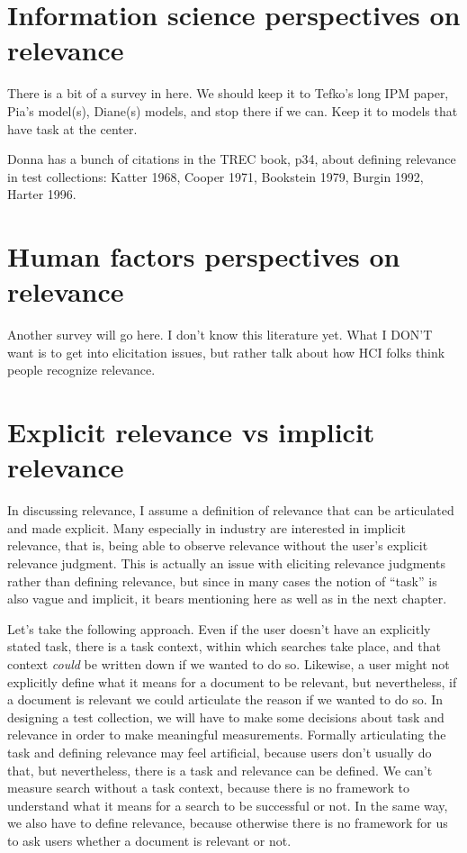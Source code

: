 \documentclass[nobib]{tufte-book}
\begin{document}
\section{Information science perspectives on relevance}

There is a bit of a survey in here.  We should keep it to Tefko's long IPM paper, Pia's model(s), Diane(s) models, and stop there if we can.  Keep it to models that have task at the center.

Donna has a bunch of citations in the TREC book, p34, about defining relevance in test collections: Katter 1968, Cooper 1971, Bookstein 1979, Burgin 1992, Harter 1996.

\section{Human factors perspectives on relevance}

Another survey will go here.  I don't know this literature yet.  What I DON'T want is to get into elicitation issues, but rather talk about how HCI folks think people recognize relevance.

\section{Explicit relevance vs implicit relevance}

In discussing relevance, I assume a definition of relevance that can be articulated and made explicit.  Many especially in industry are interested in implicit relevance, that is, being able to observe relevance without the user's explicit relevance judgment.  This is actually an issue with eliciting relevance judgments rather than defining relevance, but since in many cases the notion of ``task'' is also vague and implicit, it bears mentioning here as well as in the next chapter.

Let's take the following approach.  Even if the user doesn't have an explicitly stated task, there is a task context, within which searches take place, and that context {\em could} be written down if we wanted to do so.  Likewise, a user might not explicitly define what it means for a document to be relevant, but nevertheless, if a document is relevant we could articulate the reason if we wanted to do so.  In designing a test collection, we will have to make some decisions about task and relevance in order to make meaningful measurements.  Formally articulating the task and defining relevance may feel artificial, because users don't usually do that, but nevertheless, there is a task and relevance can be defined.  We can't measure search without a task context, because there is no framework to understand what it means for a search to be successful or not.  In the same way, we also have to define relevance, because otherwise there is no framework for us to ask users whether a document is relevant or not.
\end{document}
